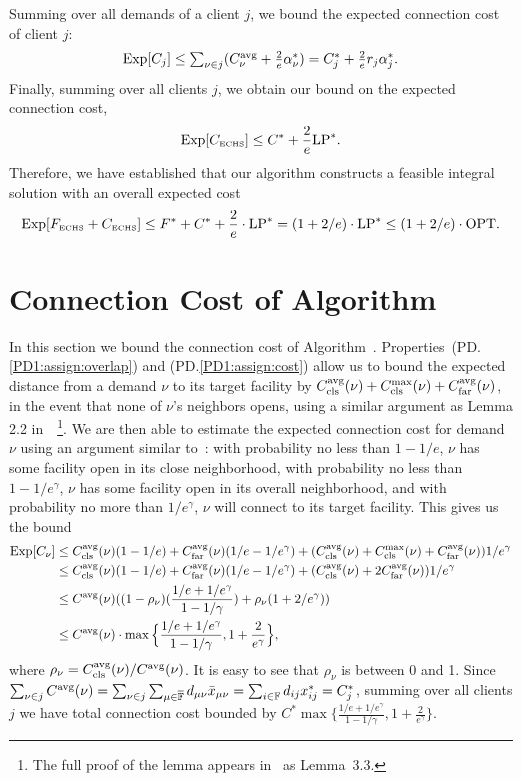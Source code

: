 \documentclass[11pt]{article}
\begin{document}
Summing over all demands of a client $j$, we bound
the expected connection cost of client $j$:
%
\begin{equation*}
  \mbox{\rm Exp}[C_j] \leq {\textstyle\sum_{\nu\in j} (C^{{\mbox{\scriptsize\rm avg}}}_{\nu} + \frac{2}{e}\alpha_{\nu}^\ast) }
  = \textstyle{ C_j^\ast + \frac{2}{e}r_j\alpha_j^\ast}.
\end{equation*}
%
Finally, summing over all clients $j$, we obtain our bound on
the expected connection cost,
%
\begin{equation*}
	 \mbox{\rm Exp}[ C_{\mbox{\tiny\rm ECHS}}] \le C^\ast +
\frac{2}{e}\mbox{\rm LP}^\ast.
\end{equation*}
% 
Therefore, we have established that
our algorithm constructs a feasible integral solution with
an overall expected cost 
%
\begin{equation*}
  \label{eq:chudakall}
	 \mbox{\rm Exp}[ F_{\mbox{\tiny\rm ECHS}} + C_{\mbox{\tiny\rm ECHS}}]
	\le
  	F^\ast + C^\ast + \frac{2}{e}\cdot \mbox{\rm LP}^\ast = (1+2/e)\cdot \mbox{\rm LP}^\ast
  \leq (1+2/e)\cdot \mbox{\rm OPT}.
\end{equation*}
%

\section{Connection Cost of Algorithm~{\EBGS}}
\label{app:EBGS}
In this section we bound the connection cost of
Algorithm~{\EBGS}. Properties~(PD.\ref{PD1:assign:overlap}) and
(PD.\ref{PD1:assign:cost}) allow us to bound the expected distance
from a demand $\nu$ to its target facility by
$C_{\text{cls}}^{{\mbox{\scriptsize\rm avg}}}(\nu)+C_{\text{cls}}^{\max}(\nu)+C_{\text{far}}^{{\mbox{\scriptsize\rm avg}}}(\nu)$, in the event that none of
$\nu$'s neighbors opens, using a similar argument as Lemma 2.2
in~\cite{ByrkaGS10}~\footnote{The full proof of the lemma appears
  in~\cite{ByrkaA10} as Lemma~3.3.}. We are then able to estimate the
expected connection cost for demand $\nu$ using an argument similar
to~\cite{ByrkaGS10}: with probability no less than $1-1/e$, $\nu$ has
some facility open in its close neighborhood, with probability no less
than $1-1/e^\gamma$, $\nu$ has some facility open in its overall
neighborhood, and with probability no more than $1/e^\gamma$, $\nu$
will connect to its target facility.  This gives us the bound
%
\begin{align*}
  \mbox{\rm Exp}[C_{\nu}] &\leq C_{\text{cls}}^{{\mbox{\scriptsize\rm avg}}}(\nu)(1-1/e) +
  C_{\text{far}}^{{\mbox{\scriptsize\rm avg}}}(\nu)(1/e-1/e^\gamma) + (C_{\text{cls}}^{{\mbox{\scriptsize\rm avg}}}(\nu)+C_{\text{cls}}^{\max}(\nu)+C_{\text{far}}^{{\mbox{\scriptsize\rm avg}}}(\nu))1/e^\gamma \\
  &\leq C_{\text{cls}}^{{\mbox{\scriptsize\rm avg}}}(\nu)(1-1/e) +
  C_{\text{far}}^{{\mbox{\scriptsize\rm avg}}}(\nu)(1/e-1/e^\gamma) + (C_{\text{cls}}^{{\mbox{\scriptsize\rm avg}}}(\nu)+2C_{\text{far}}^{{\mbox{\scriptsize\rm avg}}}(\nu))1/e^\gamma\\
  &\leq
  C^{{\mbox{\scriptsize\rm avg}}}(\nu)((1-\rho_{\nu})(\frac{1/e+1/e^\gamma}{1-1/\gamma})
  + \rho_{\nu}(1+2/e^\gamma)) \\
  &\leq C^{{\mbox{\scriptsize\rm avg}}}(\nu) \cdot
  \max\Big\{\frac{1/e+1/e^\gamma}{1-1/\gamma},
  1+\frac{2}{e^\gamma}\Big\},
\end{align*}
%
where $\rho_{\nu}=C_{\text{cls}}^{{\mbox{\scriptsize\rm avg}}}(\nu)/C^{{\mbox{\scriptsize\rm avg}}}(\nu)$. It is easy to see that
$\rho_{\nu}$ is between 0 and 1.  Since $\sum_{\nu\in j} C^{{\mbox{\scriptsize\rm avg}}}(\nu)
= \sum_{\nu\in j}\sum_{\mu\in\overline{\mathbb{F}}} d_{\mu\nu}{\bar x}_{\mu\nu} =
\sum_{i\in\mathbb{F}} d_{ij}x_{ij}^\ast = C_j^\ast$, summing over all
clients $j$ we have total connection cost bounded by $C^\ast
\max\{\frac{1/e+1/e^\gamma}{1-1/\gamma}, 1+\frac{2}{e^\gamma}\}$.
\end{document}
